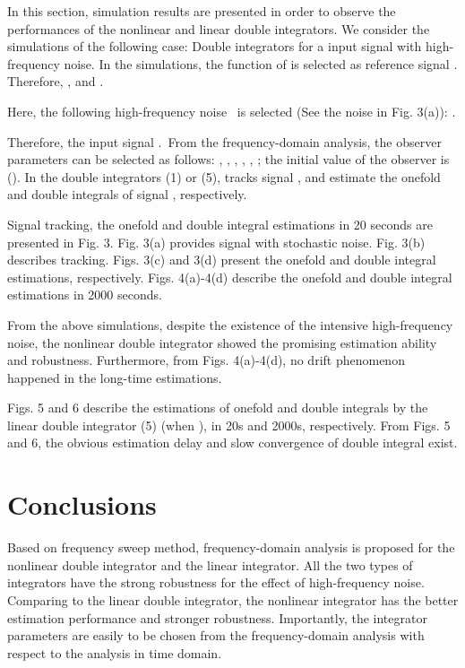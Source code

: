\documentclass[10pt,journal]{IEEEtran}
\begin{document}
In this section, simulation results are presented in order to observe the
performances of the nonlinear and linear double integrators. We consider the
simulations of the following case: Double integrators for a input signal
with high-frequency noise. In the simulations, the function of  is selected as reference signal .
Therefore, , and .

Here, the following high-frequency noise \ is selected (See the
noise in Fig. 3(a)): .

Therefore, the input signal .\ From the
frequency-domain analysis, the observer parameters can be selected as
follows: , , , , , ; the initial value of the observer is (). In the double
integrators (1) or (5),  tracks signal ,  and  estimate the onefold and double integrals of signal ,
respectively.

Signal  tracking, the onefold and double integral estimations in
20 seconds are presented in Fig. 3. Fig. 3(a) provides signal  with stochastic noise. Fig. 3(b) describes  tracking.
Figs. 3(c) and 3(d) present the onefold and double integral estimations,
respectively. Figs. 4(a)-4(d) describe the onefold and double integral
estimations in 2000 seconds.

From the above simulations, despite the existence of the intensive
high-frequency noise, the nonlinear double integrator showed the promising
estimation ability and robustness. Furthermore, from Figs. 4(a)-4(d), no
drift phenomenon happened in the long-time estimations.

Figs. 5 and 6 describe the estimations of onefold and double integrals by
the linear double integrator (5) (when ), in 20s and 2000s,
respectively. From Figs. 5 and 6, the obvious estimation delay and slow
convergence of double integral exist.

\section{Conclusions}

Based on frequency sweep method, frequency-domain analysis is proposed for
the nonlinear double integrator and the linear integrator. All the two types
of integrators have the strong robustness for the effect of high-frequency
noise. Comparing to the linear double integrator, the nonlinear integrator
has the better estimation performance and stronger robustness. Importantly,
the integrator parameters are easily to be chosen from the frequency-domain
analysis with respect to the analysis in time domain.
\end{document}
